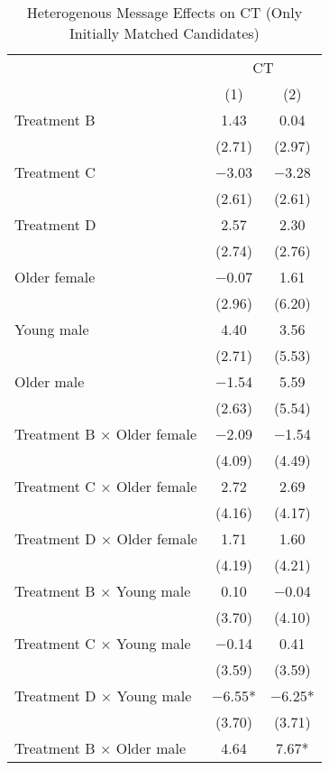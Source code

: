 \documentclass[12pt, a4paper]{article}
\begin{document}
\begin{table}[H]

\caption{\label{tab:lm-test-interaction-init-reg}Heterogenous Message Effects on CT (Only Initially Matched Candidates)}
\centering
\fontsize{8}{10}\selectfont
\begin{threeparttable}
\begin{tabular}[t]{lcc}
\toprule
\multicolumn{1}{c}{ } & \multicolumn{2}{c}{CT} \\
\cmidrule(l{3pt}r{3pt}){2-3}
  & (1) & (2)\\
\midrule
Treatment B & \num{1.43} & \num{0.04}\\
 & (\num{2.71}) & (\num{2.97})\\
Treatment C & \num{-3.03} & \num{-3.28}\\
 & (\num{2.61}) & (\num{2.61})\\
Treatment D & \num{2.57} & \num{2.30}\\
 & (\num{2.74}) & (\num{2.76})\\
Older female & \num{-0.07} & \num{1.61}\\
 & (\num{2.96}) & (\num{6.20})\\
Young male & \num{4.40} & \num{3.56}\\
 & (\num{2.71}) & (\num{5.53})\\
Older male & \num{-1.54} & \num{5.59}\\
 & (\num{2.63}) & (\num{5.54})\\
Treatment B $\times$ Older female & \num{-2.09} & \num{-1.54}\\
 & (\num{4.09}) & (\num{4.49})\\
Treatment C $\times$ Older female & \num{2.72} & \num{2.69}\\
 & (\num{4.16}) & (\num{4.17})\\
Treatment D $\times$ Older female & \num{1.71} & \num{1.60}\\
 & (\num{4.19}) & (\num{4.21})\\
Treatment B $\times$ Young male & \num{0.10} & \num{-0.04}\\
 & (\num{3.70}) & (\num{4.10})\\
Treatment C $\times$ Young male & \num{-0.14} & \num{0.41}\\
 & (\num{3.59}) & (\num{3.59})\\
Treatment D $\times$ Young male & \num{-6.55}* & \num{-6.25}*\\
 & (\num{3.70}) & (\num{3.71})\\
Treatment B $\times$ Older male & \num{4.64} & \num{7.67}*\\

\end{tabular}
\end{threeparttable}
\end{table}
\end{document}
